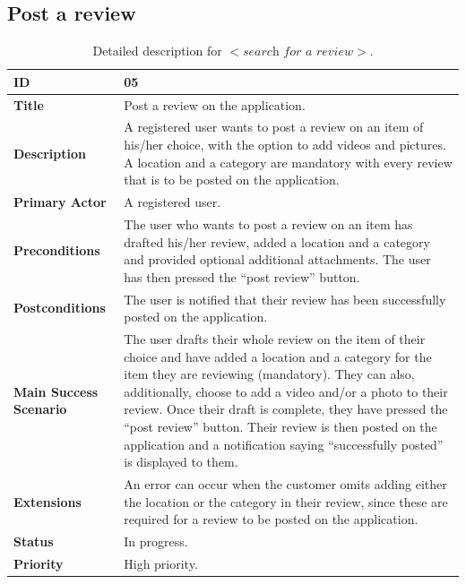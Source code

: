 \documentclass[11pt]{extarticle}
\begin{document}
\newpage
\subsection{Post a review}
\begin{table}[H]
    \begin{center}
        \begin{tabular}{ |m{6cm}|p{6cm}| } 
           \hline
           \textbf{ID} & 05\\
           \hline
           \textbf{Title} & Post a review on the application.\\
           \hline
           \textbf{Description} & A registered user wants to post a review on an item of his/her choice, with the option to add videos and pictures. A location and a category are mandatory with every review that is to be posted on the application.\\
           \hline
           \textbf{Primary Actor} & A registered user.\\
           \hline
           \textbf{Preconditions} & The user who wants to post a review on an item has drafted his/her review, added a location and a category and provided optional additional attachments. The user has then pressed the “post review” button.\\
           \hline
           \textbf{Postconditions} & The user is notified that their review has been successfully posted on the application.\\
           \hline
           \textbf{Main Success Scenario} & The user drafts their whole review on the item of their choice and have added a location and a category for the item they are reviewing (mandatory). They can also, additionally, choose to add a video and/or a photo to their review. Once their draft is complete, they have pressed the “post review” button. Their review is then posted on the application and a notification saying “successfully posted” is displayed to them.\\
           \hline
           \textbf{Extensions} & An error can occur when the customer omits adding either the location or the category in their review, since these are required for a review to be posted on the application.\\
           \hline
           \textbf{Status} & In progress.\\
           \hline
           \textbf{Priority} & High priority.\\
           \hline
        \end{tabular}
    \end{center}
    \caption{\label{tab:Table 5} Detailed description for $<\textit{search for a review}>$.}
\end{table}
\end{document}

